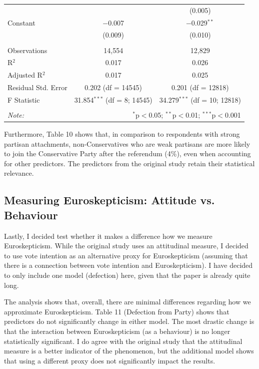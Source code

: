 \documentclass[12pt,letterpaper]{article}
\begin{document}
\begin{table}[H]
{\begin{tabular}{@{\extracolsep{5pt}}lcc}
				&  & (0.005) \\ 
				Constant & $-$0.007 & $-$0.029$^{**}$ \\ 
				& (0.009) & (0.010) \\ 
				\hline \\[-1.8ex] 
				Observations & 14,554 & 12,829 \\ 
				R$^{2}$ & 0.017 & 0.026 \\ 
				Adjusted R$^{2}$ & 0.017 & 0.025 \\ 
				Residual Std. Error & 0.202 (df = 14545) & 0.201 (df = 12818) \\ 
				F Statistic & 31.854$^{***}$ (df = 8; 14545) & 34.279$^{***}$ (df = 10; 12818) \\ 
				\hline 
				\hline \\[-1.8ex] 
				\textit{Note:}  & \multicolumn{2}{r}{$^{*}$p$<$0.05; $^{**}$p$<$0.01; $^{***}$p$<$0.001} \\ 
			\end{tabular} 
		}
	\end{table}
	
	Furthermore, Table 10 shows that, in comparison to respondents with strong partisan attachments, non-Conservatives who are weak partisans are more likely to join the Conservative Party after the referendum (4\%), even when accounting for other predictors. The predictors from the original study retain their statistical relevance. 
	
	\subsection{Measuring Euroskepticism: Attitude vs. Behaviour}
	Lastly, I decided test whether it makes a difference how we measure Euroskepticism. While the original study uses an attitudinal measure, I decided to use vote intention as an alternative proxy for Euroskepticism (assuming that there is a connection between vote intention and Euroskepticism). I have decided to only include one model (defection) here, given that the paper is already quite long. 
	
	The analysis shows that, overall, there are minimal differences regarding how we approximate Euroskepticism. Table 11 (Defection from Party) shows that predictors do not significantly change in either model. The most drastic change is that the interaction between Euroskepticism (as a behaviour) is no longer statistically significant. I do agree with the original study that the attitudinal measure is a better indicator of the phenomenon, but the additional model shows that using a different proxy does not significantly impact the results. 
	
\end{document}
